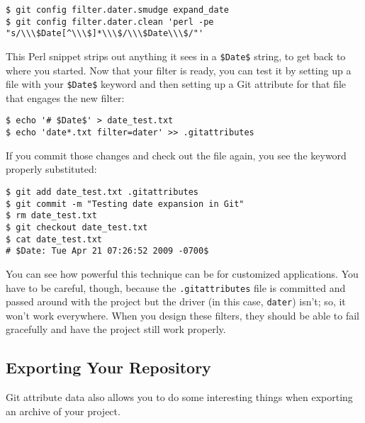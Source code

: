 \documentclass[a4paper]{book}
\begin{document}
\begin{shaded}\begin{verbatim}
$ git config filter.dater.smudge expand_date
$ git config filter.dater.clean 'perl -pe "s/\\\$Date[^\\\$]*\\\$/\\\$Date\\\$/"'
\end{verbatim}\end{shaded}

This Perl snippet strips out anything it sees in a \texttt{\$Date\$} string, to get back to where you started. Now that your filter is ready, you can test it by setting up a file with your \texttt{\$Date\$} keyword and then setting up a Git attribute for that file that engages the new filter:

\begin{shaded}\begin{verbatim}
$ echo '# $Date$' > date_test.txt
$ echo 'date*.txt filter=dater' >> .gitattributes
\end{verbatim}\end{shaded}

If you commit those changes and check out the file again, you see the keyword properly substituted:

\begin{shaded}\begin{verbatim}
$ git add date_test.txt .gitattributes
$ git commit -m "Testing date expansion in Git"
$ rm date_test.txt
$ git checkout date_test.txt
$ cat date_test.txt
# $Date: Tue Apr 21 07:26:52 2009 -0700$
\end{verbatim}\end{shaded}

You can see how powerful this technique can be for customized applications. You have to be careful, though, because the \texttt{.gitattributes} file is committed and passed around with the project but the driver (in this case, \texttt{dater}) isn't; so, it won't work everywhere. When you design these filters, they should be able to fail gracefully and have the project still work properly.

\subsection{Exporting Your Repository}

Git attribute data also allows you to do some interesting things when exporting an archive of your project.
\end{document}
